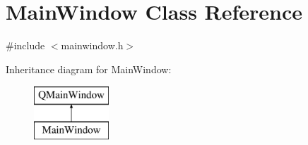 \hypertarget{class_main_window}{}\section{Main\+Window Class Reference}
\label{class_main_window}


{\ttfamily \#include $<$mainwindow.\+h$>$}

Inheritance diagram for Main\+Window\+:\begin{figure}[H]
\begin{center}
\leavevmode
\includegraphics[height=2.000000cm]{class_main_window}
\end{center}
\end{figure}
